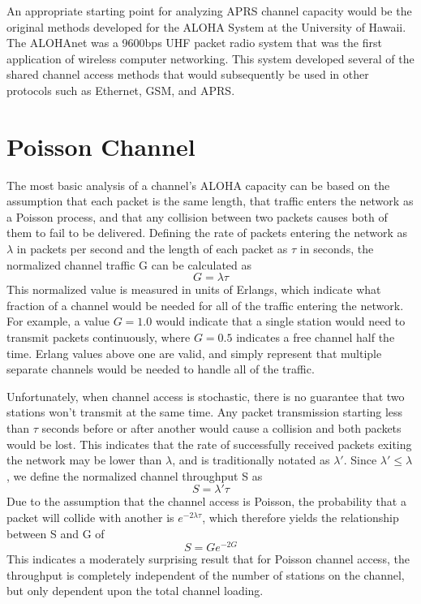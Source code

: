 An appropriate starting point for analyzing APRS channel capacity would be the original methods
developed for the ALOHA System at the University of Hawaii\cite{packetthroughput}.
The ALOHAnet was a 9600bps UHF packet radio system that was the first application of 
wireless computer networking.
This system developed several of the shared channel access methods 
that would subsequently be used in other protocols such as Ethernet, GSM, and APRS.

\section{Poisson Channel}

The most basic analysis of a channel's ALOHA capacity can be based on the assumption that
each packet is the same length, 
that traffic enters the network as a Poisson process,
and that any collision between two packets causes both of them to fail to be delivered.
Defining the rate of packets entering the network as $\lambda$ in packets per second and
the length of each packet as $\tau$ in seconds, the normalized channel traffic G can be
calculated as
\begin{equation}
	G = \lambda \tau
\end{equation}
This normalized value is measured in units of Erlangs,
which indicate what fraction of a channel would be needed for all
of the traffic entering the network.
For example, a value $G=1.0$ would indicate that
a single station would need to transmit packets continuously, where $G=0.5$ indicates 
a free channel half the time.
Erlang values above one are valid, and simply represent that multiple separate
channels would be needed to handle all of the traffic.

Unfortunately, when channel access is stochastic,
there is no guarantee that two stations won't transmit at the same time.
Any packet transmission starting less than $\tau$ seconds before or after another would
cause a collision and both packets would be lost.
This indicates that the rate of successfully received packets exiting the network may
be lower than $\lambda$, and is traditionally notated as $\lambda'$. 
Since $\lambda' \leq \lambda$, we define the normalized channel throughput S as
\begin{equation}
	S = \lambda' \tau
\end{equation}
Due to the assumption that the channel access is Poisson, 
the probability that a packet will collide with another is $e^{-2 \lambda \tau}$,
which therefore yields the relationship between S and G of
\begin{equation}
	S = G e ^ {-2 G}
\end{equation}
This indicates a moderately surprising result that for Poisson channel access,
the throughput is completely independent of the number of stations on the channel,
but only dependent upon the total channel loading.

